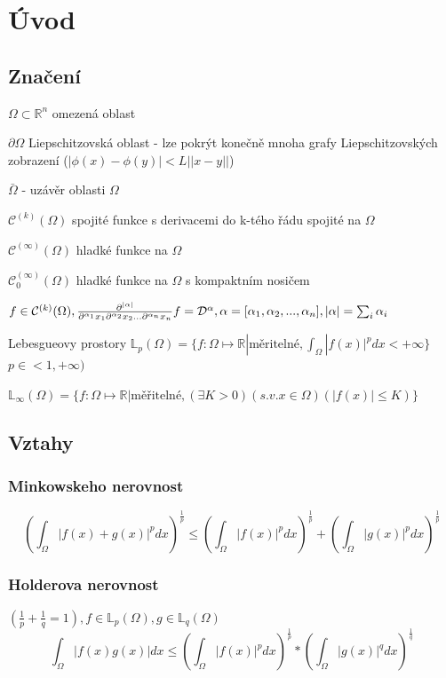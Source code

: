 \documentclass[../main.tex]{subfiles}
\begin{document}
\section{Úvod}

\subsection{Značení}


$\Omega \subset \mathbb{R}^n$ omezená oblast

$\partial\Omega$ Liepschitzovská oblast - lze pokrýt konečně mnoha grafy Liepschitzovských zobrazení ($|\phi(x) -  \phi(y)| < L ||x-y||$)

$\bar{\Omega}$ - uzávěr oblasti $\Omega$

$\mathcal{C}^{(k)}(\Omega)$ spojité funkce s derivacemi do k-tého řádu spojité na $\Omega$

$\mathcal{C}^{(\infty)}(\Omega)$ hladké funkce na $\Omega$


$\mathcal{C}^{(\infty)}_0(\Omega)$ hladké funkce na $\Omega$ s kompaktním nosičem


$f\in\mathcal{C}^{(k)}(\Omega), \frac{\partial^{|\alpha|}}{\partial^{\alpha_1}x_1\partial^{\alpha_2}x_2...\partial^{\alpha_n}x_n} f = \mathcal{D}^\alpha, \alpha = [\alpha_1, \alpha_2, ..., \alpha_n], |\alpha|=\sum_i \alpha_i $




Lebesgueovy prostory
$\mathbb{L}_p(\Omega) = \{f: \Omega \mapsto \mathbb{R}| \text{měritelné}, \int_{\Omega}|f(x)|^p dx < +\infty \}$
$p \in <1, +\infty)$

$\mathbb{L}_\infty(\Omega) = \{  f:\Omega\mapsto\mathbb{R} | \text{měřitelné}, (\exists K > 0)(s.v. x \in\Omega)(|f(x)| \leq K)  \}$


\subsection{Vztahy}

\subsubsection{Minkowskeho nerovnost}
\begin{equation}\label{eq:Mink}
    \left ( \int_\Omega |f(x) + g(x)|^p dx \right ) ^{\frac{1}{p}} \leq \left ( \int_\Omega |f(x)|^p dx \right ) ^{\frac{1}{p}} + \left ( \int_\Omega |g(x)|^p dx \right ) ^{\frac{1}{p}}
\end{equation}


\subsubsection{Holderova nerovnost}
$\left (  \frac{1}{p} + \frac{1}{q} = 1 \right ), f \in \mathbb{L}_p(\Omega), g \in \mathbb{L}_q(\Omega)$
\begin{equation}\label{eq:Holder}
    \int_\Omega \left| f(x)g(x) \right| dx \leq \left ( \int_\Omega |f(x)|^p dx \right ) ^{\frac{1}{p}} * \left ( \int_\Omega |g(x)|^q dx \right ) ^{\frac{1}{q}}
\end{equation}
\end{document}
